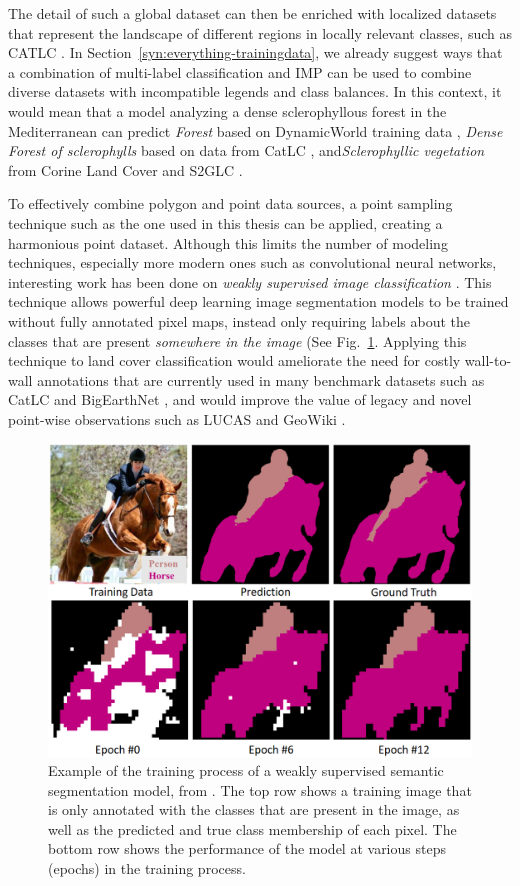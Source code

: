             
            The detail of such a global dataset can then be enriched with localized datasets that represent the landscape of different regions in locally relevant classes, such as CATLC \citep{garcia2022catlc}. In Section\@~\ref{syn:everything-trainingdata}, we already suggest ways that a combination of multi-label classification and IMP can be used to combine diverse datasets with incompatible legends and class balances. In this context, it would mean that a model analyzing a dense sclerophyllous forest in the Mediterranean can predict \textit{Forest} based on DynamicWorld training data \citep{tait2021dwtd}, \textit{Dense Forest of sclerophylls} based on data from CatLC \citep{garcia2022catlc}, and\textit{Sclerophyllic vegetation} from Corine Land Cover and S2GLC \citep{jenerowicz2021validation}. 

            To effectively combine polygon and point data sources, a point sampling technique such as the one used in this thesis can be applied, creating a harmonious point dataset. Although this limits the number of modeling techniques, especially more modern ones such as convolutional neural networks, interesting work has been done on \textit{weakly supervised image classification} \citep{huang2018weaklysupervised}. This technique allows powerful deep learning image segmentation models to be trained without fully annotated pixel maps, instead only requiring labels about the classes that are present \textit{somewhere in the image} (See Fig.\@~\ref{fig:weaklysupervised}. Applying this technique to land cover classification would ameliorate the need for costly wall-to-wall annotations that are currently used in many benchmark datasets such as CatLC \citep{garcia2022catlc} and BigEarthNet \citep{sumbul2021bigearthnet}, and would improve the value of legacy and novel point-wise observations such as LUCAS \citep{dandrimont2021lucas} and GeoWiki \citep{fritz2012geo}.

            \begin{figure}[H]
            \centering
            \includegraphics[width=0.5\linewidth]{figs_06/huang_person_horse.png}
            \caption{Example of the training process of a weakly supervised semantic segmentation model, from \citet{huang2018weaklysupervised}. The top row shows a training image that is only annotated with the classes that are present in the image, as well as the predicted and true class membership of each pixel. The bottom row shows the performance of the model at various steps (epochs) in the training process.}
            \label{fig:weaklysupervised}
            \end{figure}

